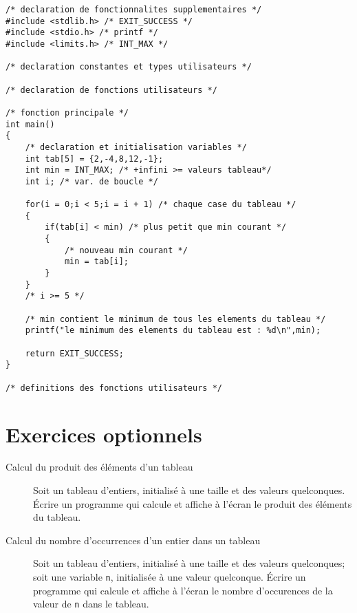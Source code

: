 \begin{correction}
\begin{verbatim}
/* declaration de fonctionnalites supplementaires */
#include <stdlib.h> /* EXIT_SUCCESS */
#include <stdio.h> /* printf */
#include <limits.h> /* INT_MAX */

/* declaration constantes et types utilisateurs */

/* declaration de fonctions utilisateurs */

/* fonction principale */
int main()
{
    /* declaration et initialisation variables */
    int tab[5] = {2,-4,8,12,-1};
    int min = INT_MAX; /* +infini >= valeurs tableau*/
    int i; /* var. de boucle */

    for(i = 0;i < 5;i = i + 1) /* chaque case du tableau */
    {
        if(tab[i] < min) /* plus petit que min courant */
        {
            /* nouveau min courant */
            min = tab[i];
        }
    }
    /* i >= 5 */
    
    /* min contient le minimum de tous les elements du tableau */
    printf("le minimum des elements du tableau est : %d\n",min);

    return EXIT_SUCCESS;
}

/* definitions des fonctions utilisateurs */
\end{verbatim}
\end{correction}

\section{Exercices optionnels}

\begin{description}
\item[Calcul du produit des éléments d'un tableau] Soit un tableau d'entiers, initialisé à une taille et des
valeurs quelconques. Écrire un programme qui calcule et affiche à
l'écran le produit des éléments du tableau.
\item[Calcul du nombre d'occurrences d'un entier dans un tableau] Soit un tableau d'entiers, initialisé à une taille et des
valeurs quelconques; soit une variable \verb|n|, initialisée à une valeur quelconque. Écrire un programme qui calcule et affiche à
l'écran le nombre d'occurences de la valeur de \verb|n| dans le tableau.
\end{description}
